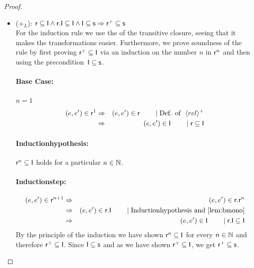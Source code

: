 \documentclass[a4paper,twoside,12pt, english]{article}
\begin{document}
\begin{proof}
\begin{itemize}
\item ($+_L$): $\sf r \subseteq I \land r.I \subseteq I \land I \subseteq s \Rightarrow r^+ \subseteq s$ \\
For the induction rule we use the  of the transitive closure, seeing that it makes the transformations easier. Furthermore, we prove soundness of the rule by first proving $\textsf{\upshape r}^+ \subseteq \textsf{\upshape I}$ via an induction on the number $n$ in $\textsf{\upshape r}^n$ and then using the precondition~$\textsf{\upshape I} \subseteq \textsf{\upshape s}$. 

\paragraph{Base Case:} $n=1$
\begin{eqnarray*}
(e,e') \in  \textsf{\upshape r}^1 &\Rightarrow & (e,e') \in  \textsf{\upshape r} \qquad \mid \text{Def. of }~ \langle rel \rangle^+ \\
&\Rightarrow & (e,e') \in  \textsf{\upshape I} \qquad \mid \textsf{\upshape r} \subseteq \textsf{\upshape I} 
\end{eqnarray*}
\paragraph{Inductionhypothesis:} $\textsf{\upshape r}^n \subseteq \textsf{\upshape I}$ holds for a particular $n \in \mathbb{N}$. 
\paragraph{Inductionstep:}
\begin{eqnarray*}
\edgein \relr^{n+1} &\impl & (e,e') \in \relr.\relr^{n} \\
&\impl & \edgein \relr.\relI \reason{\text{Inductionhypothesis and } \Cref{lem:bmono}}\\
&\impl & \edgein \relI \reason{\relr.\relI \subseteq \relI}
\end{eqnarray*}
By the principle of the induction we have shown $\textsf{\upshape r}^n \subseteq \textsf{\upshape I}$ for every $n \in \mathbb{N}$ and therefore $\textsf{\upshape r}^+ \subseteq \textsf{\upshape I}$.
Since $\textsf{\upshape I} \subseteq \textsf{\upshape s}$ and as we have shown $\textsf{\upshape r}^+ \subseteq \textsf{\upshape I}$, we get $\textsf{\upshape r}^+ \subseteq \textsf{\upshape s}$.


\end{itemize}
\end{proof}
\end{document}
